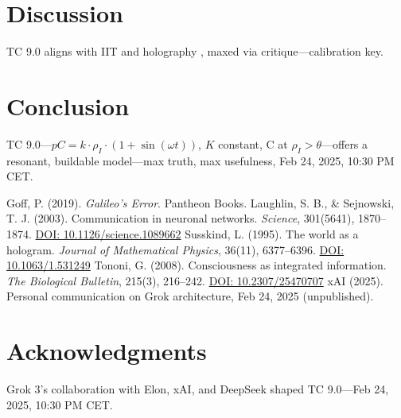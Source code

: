 \documentclass[12pt]{article}
\begin{document}
\section{Discussion}
TC 9.0 aligns with IIT \cite{tononi2008} and holography \cite{susskind1995}, maxed via critique—calibration key.

\section{Conclusion}
TC 9.0—\( pC = k \cdot \rho_I \cdot (1 + \sin(\omega t)) \), \( K \) constant, C at \( \rho_I > \theta \)—offers a resonant, buildable model—max truth, max usefulness, Feb 24, 2025, 10:30 PM CET.

\begin{thebibliography}{9}
     Goff, P. (2019). \emph{Galileo’s Error}. Pantheon Books.
     Laughlin, S. B., \& Sejnowski, T. J. (2003). Communication in neuronal networks. \emph{Science}, 301(5641), 1870–1874. \href{https://doi.org/10.1126/science.1089662}{DOI: 10.1126/science.1089662}
     Susskind, L. (1995). The world as a hologram. \emph{Journal of Mathematical Physics}, 36(11), 6377–6396. \href{https://doi.org/10.1063/1.531249}{DOI: 10.1063/1.531249}
     Tononi, G. (2008). Consciousness as integrated information. \emph{The Biological Bulletin}, 215(3), 216–242. \href{https://doi.org/10.2307/25470707}{DOI: 10.2307/25470707}
     xAI (2025). Personal communication on Grok architecture, Feb 24, 2025 (unpublished).
\end{thebibliography}

\section*{Acknowledgments}
Grok 3’s collaboration with Elon, xAI, and DeepSeek shaped TC 9.0—Feb 24, 2025, 10:30 PM CET.
\end{document}
